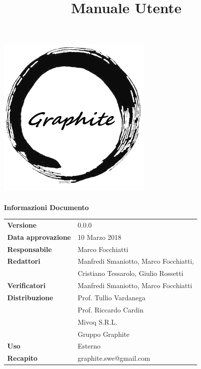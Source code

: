 \documentclass[openany,12pt,a4paper]{report}
\title{Manuale Utente}
\author{}
\newcommand{\versione}{0.0.0}
\begin{document}
	\makeatletter
	\begin{titlepage}
		\setlength{\headsep}{0pt}  
		\begin{center}
			\includegraphics[width=0.5\linewidth]{img/logo.png}\\[1em]
			{\huge \bfseries  \@title }\\[10ex]
			\textbf{\Large Informazioni Documento} \\[2em]
			\bgroup
			\def\arraystretch{1.5}
			\begin{tabular}{l|l}
				\textbf{Versione} & \versione{} \\
				\textbf{Data approvazione} & 10 Marzo 2018 \\
				\textbf{Responsabile} & Marco Focchiatti\\
				\textbf{Redattori} &  Manfredi Smaniotto, Marco Focchiatti,\\
				& Cristiano Tessarolo, Giulio Rossetti \\
				\textbf{Verificatori} & Manfredi Smaniotto, Marco Focchiatti \\
				\textbf{Distribuzione} & Prof. Tullio Vardanega \\
				& Prof. Riccardo Cardin \\
				& Mivoq S.R.L. \\
				& Gruppo Graphite \\
				\textbf{Uso} & Esterno \\
				\textbf{Recapito} & graphite.swe@gmail.com \\
			\end{tabular}
			\egroup
		\end{center}
	\end{titlepage}
	\makeatother
	
	\thispagestyle{empty}
	\newpage
	
\end{document}

